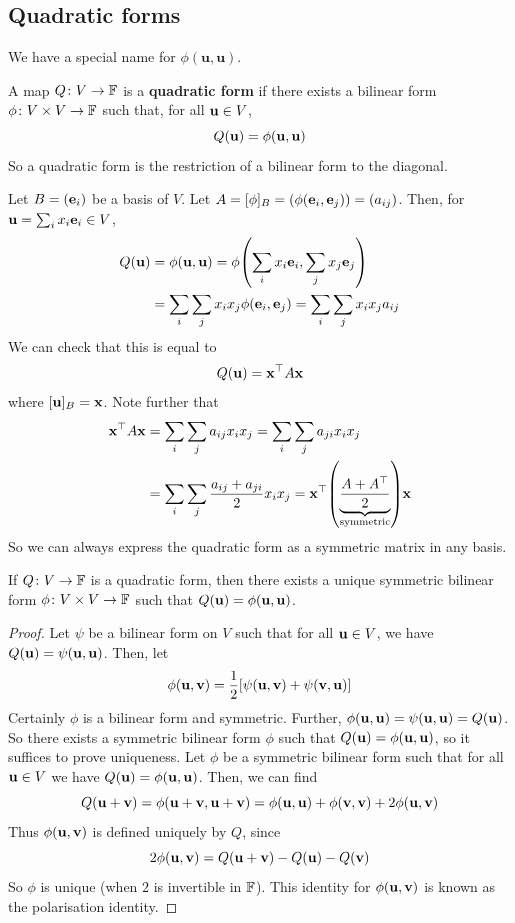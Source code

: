 \documentclass[a4paper]{article}
\begin{document}
\subsection{Quadratic forms}
We have a special name for $ \phi(\mathbf{u},\mathbf{u}) $. 
\begin{definition}
	A map \( Q \colon V \to {\mathbb{F}} \) is a \textbf{quadratic form} if there exists a bilinear form \( \phi \colon V \times V \to {\mathbb{F}} \) such that, for all \( {\bf u} \in V \),
	\[
		Q({\bf u}) = \phi({\bf u},{\bf u})
	\]
	So a quadratic form is the restriction of a bilinear form to the diagonal.
\end{definition}
\begin{remark}
	Let \( B = ({\bf e}_i) \) be a basis of \( V \).
	Let \( A = [\phi]_B = (\phi({\bf e}_i, {\bf e}_j)) = (a_{ij}) \).
	Then, for \( {\bf u} = \sum_i x_i {\bf e}_i \in V \),
	\begin{align*}
		Q({\bf u}) &= \phi({\bf u},{\bf u}) = \phi\qty(\sum_i x_i {\bf e}_i, \sum_j x_j {\bf e}_j) \\ 
		&= \sum_i \sum_j x_i x_j \phi({\bf e}_i, {\bf e}_j) = \sum_i \sum_j x_i x_j a_{ij}
	\end{align*}
	We can check that this is equal to
	\[
		Q({\bf u}) = {\bf x}^\top A {\bf x}
	\]
	where \( [{\bf u}]_B = {\bf x} \).
	Note further that
	\begin{align*}
		\bfx^\top A \bfx &= \sum_i \sum_j a_{ij} x_i x_j = \sum_i \sum_j a_{ji} x_i x_j \\ 
		&= \sum_i \sum_j \frac{a_{ij} + a_{ji}}{2} x_i x_j = \bfx^\top \qty(\underbrace{\frac{A + A^\top}{2}}_{\mathclap{\text{symmetric}}})\bfx
	\end{align*}
	So we can always express the quadratic form as a symmetric matrix in any basis.
\end{remark}
\begin{proposition}
	If \( Q \colon V \to {\mathbb{F}} \) is a quadratic form, then there exists a unique symmetric bilinear form \( \phi \colon V \times V \to {\mathbb{F}} \) such that \( Q({\bf u}) = \phi({\bf u},{\bf u}) \).
\end{proposition}
\begin{proof}
	Let \( \psi \) be a bilinear form on \( V \) such that for all \( {\bf u} \in V \), we have \( Q({\bf u}) = \psi({\bf u},{\bf u}) \).
	Then, let
	\[
		\phi({\bf u},{\bf v}) = \frac{1}{2}\qty[\psi({\bf u},{\bf v}) + \psi({\bf v},{\bf u})]
	\]
	Certainly \( \phi \) is a bilinear form and symmetric.
	Further, \( \phi({\bf u},{\bf u}) = \psi({\bf u},{\bf u}) = Q({\bf u}) \).
	So there exists a symmetric bilinear form \( \phi \) such that \( Q({\bf u}) = \phi({\bf u},{\bf u}) \), so it suffices to prove uniqueness.
	Let \( \phi \) be a symmetric bilinear form such that for all \( {\bf u} \in V \) we have \( Q({\bf u}) = \phi({\bf u},{\bf u}) \).
	Then, we can find
	\[
		Q({\bf u} + {\bf v}) = \phi({\bf u} + {\bf v}, {\bf u} + {\bf v}) = \phi({\bf u},{\bf u}) + \phi({\bf v},{\bf v}) + 2\phi({\bf u},{\bf v})
	\]
	Thus \( \phi({\bf u},{\bf v}) \) is defined uniquely by \( Q \), since
	\[
		2 \phi({\bf u},{\bf v}) = Q({\bf u}+{\bf v}) - Q({\bf u}) - Q({\bf v})
	\]
	So \( \phi \) is unique (when \( 2 \) is invertible in \( {\mathbb{F}} \)).
	This identity for \( \phi({\bf u},{\bf v}) \) is known as the polarisation identity.
\end{proof}
\end{document}
